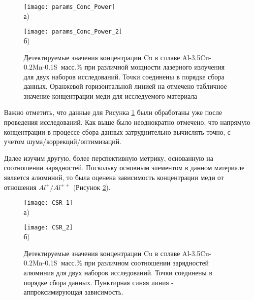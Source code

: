 \begin{figure}[htb]
	\begin{minipage}[b]{0.49\textwidth}\centering
		\texttt{[image: params\_Conc\_Power]} \\ а)
	\end{minipage}
	\begin{minipage}[b]{0.49\textwidth}\centering
		\texttt{[image: params\_Conc\_Power\_2]} \\ б)
	\end{minipage}
	\caption{Детектируемые значения концентрации Cu в сплаве Al-3.5Cu-0.2Mn-0.1S~масс.\% при различной мощности лазерного излучения для двух наборов исследований. Точки соединены в порядке сбора данных. Оранжевой горизонтальной линией на отмечено табличное значение концентрации меди для исследуемого материала}
	\label{fig:params_Conc_Power}
\end{figure}

\FloatBarrier

Важно отметить, что данные для Рисунка \cref{fig:params_Conc_Power} были обработаны уже после проведения исследований. Как выше было неоднократно отмечено, что напрямую концентрации в процессе сбора данных затруднительно вычислять точно, с учетом шума/коррекций/оптимизаций.

Далее изучим другую, более перспективную метрику, основанную на соотношении зарядностей. Поскольку основным элементом в данном материале является алюминий, то была оценена зависимость концентрации меди от отношения $Al^{+}/Al^{++}$ (Рисунок \cref{fig:params_Conc_CSR}).

\begin{figure}[htb]
	\begin{minipage}[b]{0.49\textwidth}\centering
		\texttt{[image: CSR\_1]} \\ а)
	\end{minipage}
	\begin{minipage}[b]{0.49\textwidth}\centering
		\texttt{[image: CSR\_2]} \\ б)
	\end{minipage}
	\caption{Детектируемые значения концентрации Cu в сплаве Al-3.5Cu-0.2Mn-0.1S~масс.\% при различном соотношении зарядностей алюминия для двух наборов исследований. Точки соединены в порядке сбора данных. Пунктирная синяя линия - аппроксимирующая зависимость.}
	\label{fig:params_Conc_CSR}
\end{figure}

